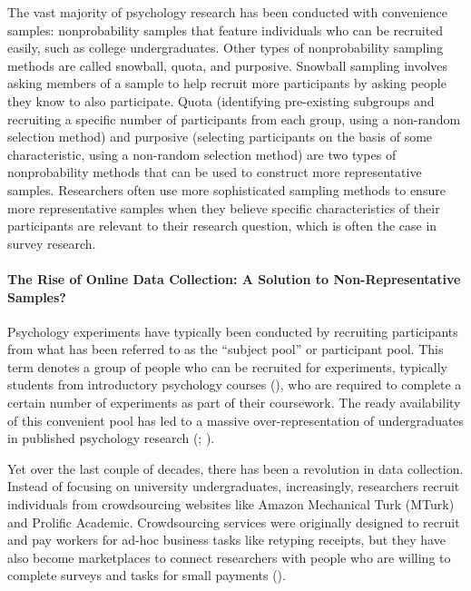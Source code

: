 \documentclass[
]{krantz}
\begin{document}
The vast majority of psychology research has been conducted with convenience samples: nonprobability samples that feature individuals who can be recruited easily, such as college undergraduates. Other types of nonprobability sampling methods are called snowball, quota, and purposive. Snowball sampling involves asking members of a sample to help recruit more participants by asking people they know to also participate. Quota (identifying pre-existing subgroups and recruiting a specific number of participants from each group, using a non-random selection method) and purposive (selecting participants on the basis of some characteristic, using a non-random selection method) are two types of nonprobability methods that can be used to construct more representative samples. Researchers often use more sophisticated sampling methods to ensure more representative samples when they believe specific characteristics of their participants are relevant to their research question, which is often the case in survey research.

\paragraph*{The Rise of Online Data Collection: A Solution to Non-Representative Samples?}\label{the-rise-of-online-data-collection-a-solution-to-non-representative-samples}

Psychology experiments have typically been conducted by recruiting participants from what has been referred to as the ``subject pool'' or participant pool. This term denotes a group of people who can be recruited for experiments, typically students from introductory psychology courses (), who are required to complete a certain number of experiments as part of their coursework. The ready availability of this convenient pool has led to a massive over-representation of undergraduates in published psychology research (; ).

Yet over the last couple of decades, there has been a revolution in data collection. Instead of focusing on university undergraduates, increasingly, researchers recruit individuals from crowdsourcing websites like Amazon Mechanical Turk (MTurk) and Prolific Academic. Crowdsourcing services were originally designed to recruit and pay workers for ad-hoc business tasks like retyping receipts, but they have also become marketplaces to connect researchers with people who are willing to complete surveys and tasks for small payments ().
\end{document}
